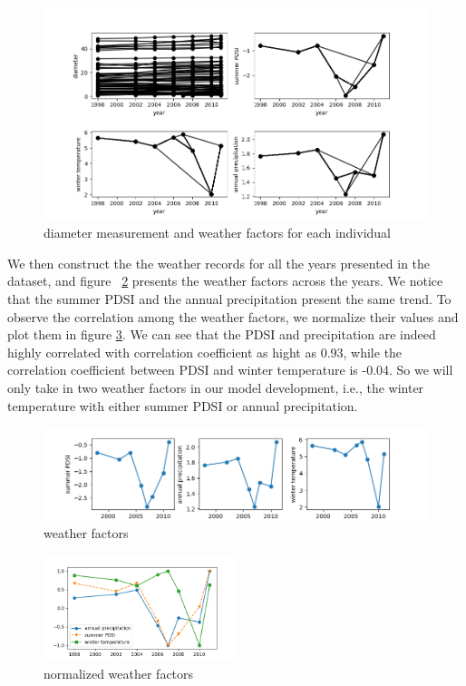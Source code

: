 \documentclass{article}
\begin{document}
\begin{figure}[h!]
    \centering
    \includegraphics[width=1\textwidth]{diameter-weather.png}
    \caption{diameter measurement and weather factors for each individual}
    \label{fig:diameter-weather}
\end{figure}

We then construct the the weather records for all the years presented in the dataset, and figure ~\ref{fig:weather} presents the weather factors across the years. We notice that the summer PDSI and the annual precipitation present the same trend. To observe the correlation among the weather factors, we normalize their values and plot them in figure \ref{fig:normalized-weather}. We can see that the PDSI and precipitation are indeed highly correlated with correlation coefficient as hight as 0.93, while the correlation coefficient between PDSI and winter temperature is -0.04. So we will only take in two weather factors in our model development, i.e., the winter temperature with either summer PDSI or annual precipitation.

\begin{figure}[h!]
    \centering
    \includegraphics[width=1\textwidth]{weather.png}
    \caption{weather factors}
    \label{fig:weather}
\end{figure}

\begin{figure}[h!]
    \centering
    \includegraphics[width=0.5\textwidth]{normalized-weather.png}
    \caption{normalized weather factors}
    \label{fig:normalized-weather}
\end{figure}
\end{document}
